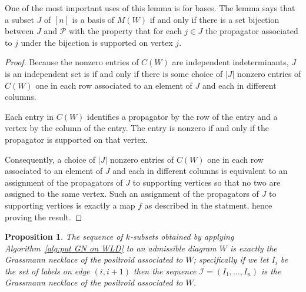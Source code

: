 \documentclass[11pt]{article}
\newcommand{\cP}{\mathcal{P}}
\newcommand{\II}{\mathcal{I}}
\newtheorem{prop}[thm]{Proposition}
\theoremstyle{remark}
\theoremstyle{definition}
\begin{document}
One of the most important uses of this lemma is for bases.  The lemma says that a subset $J$ of $[n]$ is a basis of $M(W)$ if and only if there is a set bijection between $J$ and $\cP$ with the property that for each $j\in J$ the propagator associated to $j$ under the bijection is supported on vertex $j$.

\begin{proof}
  Because the nonzero entries of $C(W)$ are independent indeterminants,
  $J$ is an independent set is if and only if there is some choice of $|J|$ nonzero entries of $C(W)$ one in each row associated to an element of $J$ and each in different columns.

  Each entry in $C(W)$ identifies a propagator by the row of the entry and a vertex by the column of the entry.  The entry is nonzero if and only if the propagator is supported on that vertex.
  
  Consequently, a choice of $|J|$ nonzero entries of $C(W)$ one in each row associated to an element of $J$ and each in different columns is equivalent to an assignment of the propagators of $J$ to supporting vertices so that no two are assigned to the same vertex.  Such an assignment of the propagators of $J$ to supporting vertices is exactly a map $f$ as described in the statment, hence proving the result.
\end{proof}

\begin{prop}\label{res:alg gives GN}
The sequence of $k$-subsets obtained by applying Algorithm~\ref{alg:put GN on WLD} to an admissible diagram $W$ is exactly the Grassmann necklace of the positroid associated to $W$; specifically if we let  $I_i$ be the set of labels on edge $(i,i+1)$ then the sequence $\II = (I_1, \dots, I_n)$ is the Grassmann necklace of the positroid associated to $W$.
\end{prop}
\end{document}
